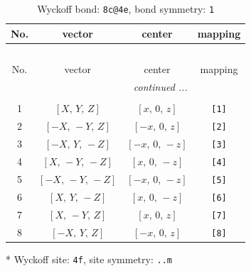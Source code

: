 \documentclass[fleqn,8pt]{jsarticle}
\begin{document}
\renewcommand{\arraystretch}{1.2}
\begin{longtable}{cccc}
\caption{Wyckoff bond: {\tt 8c@4e}, bond symmetry: {\tt 1}}
 \\
 \hline \hline
No. & vector & center & mapping \\ \hline \endfirsthead

\multicolumn{3}{l}{\tablename\ \thetable{}} \\
 \hline \hline
No. & vector & center & mapping \\ \hline \endhead

 \hline \hline
\multicolumn{3}{r}{\footnotesize\it continued ...} \\ \endfoot

 \hline \hline
\multicolumn{3}{r}{} \\ \endlastfoot

1 & $\left[ X,\, Y,\, Z \right]$ & $\left[ x,\, 0,\, z \right]$ & {\tt [1]} \\ \hline
2 & $\left[ - X,\, - Y,\, Z \right]$ & $\left[ - x,\, 0,\, z \right]$ & {\tt [2]} \\ \hline
3 & $\left[ - X,\, Y,\, - Z \right]$ & $\left[ - x,\, 0,\, - z \right]$ & {\tt [3]} \\ \hline
4 & $\left[ X,\, - Y,\, - Z \right]$ & $\left[ x,\, 0,\, - z \right]$ & {\tt [4]} \\ \hline
5 & $\left[ - X,\, - Y,\, - Z \right]$ & $\left[ - x,\, 0,\, - z \right]$ & {\tt [5]} \\ \hline
6 & $\left[ X,\, Y,\, - Z \right]$ & $\left[ x,\, 0,\, - z \right]$ & {\tt [6]} \\ \hline
7 & $\left[ X,\, - Y,\, Z \right]$ & $\left[ x,\, 0,\, z \right]$ & {\tt [7]} \\ \hline
8 & $\left[ - X,\, Y,\, Z \right]$ & $\left[ - x,\, 0,\, z \right]$ & {\tt [8]} \\
\end{longtable}
* Wyckoff site: {\tt 4f}, site symmetry: {\tt ..m}
\renewcommand{\arraystretch}{1.2}
\end{document}
